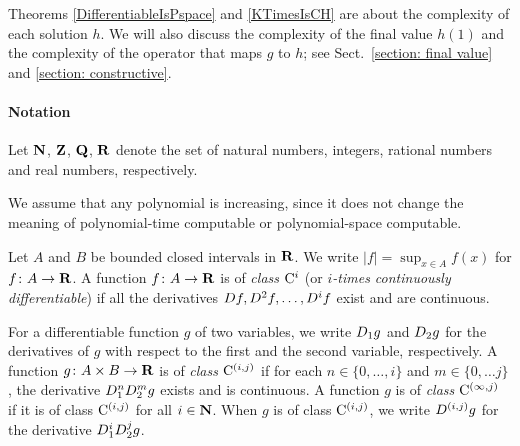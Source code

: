 Theorems \ref{DifferentiableIsPspace} and \ref{KTimesIsCH} 
are about the complexity of each solution $h$. 
We will also discuss
the complexity of the final value $h(1)$ and
the complexity of the operator that maps $g$ to $h$; 
see Sect.~\ref{section: final value} and \ref{section: constructive}. 

\paragraph{Notation}
Let $\mathbf N$, $\mathbf Z$, $\mathbf Q$, $\mathbf R$ denote the set of natural numbers,
integers,
rational numbers and 
real numbers, respectively.

We assume that any polynomial is increasing,
since it does not change the meaning of 
polynomial-time computable or polynomial-space computable.

Let $A$ and $B$ be bounded closed intervals in $\mathbf R$.
We write $|f| = \sup_{x \in A} f(x)$ for $f \colon A \to \mathbf R$.
A function $f \colon A \to \mathbf R$ is of \emph{class $\mathrm C^i$}
(or \emph{$i$-times continuously differentiable})
if all the derivatives $D f, D^2 f, \dots, D^i f$ exist and are continuous.

For a differentiable function $g$ of two variables, 
we write $D _1 g$ and $D _2 g$ for the derivatives of $g$ 
with respect to the first and the second variable,
respectively.
A function $g \colon A \times B \to \mathbf R$ is of \emph{class $\mathrm C^{(i, j)}$}
if for each $n \in \{0, \dots, i\}$ and $m \in \{0, \dots j\}$,
the derivative $D_1^n D_2^m g$ exists and is continuous.
A function $g$ is of \emph{class $\mathrm C^{(\infty, j)}$}
if it is of class $\mathrm C^{(i, j)}$ for all $i \in \mathbf N$.
When $g$ is of class $\mathrm C^{(i,j)}$,
we write $D^{(i,j)}g$ for the derivative $D_1^i D_2^j g$.
